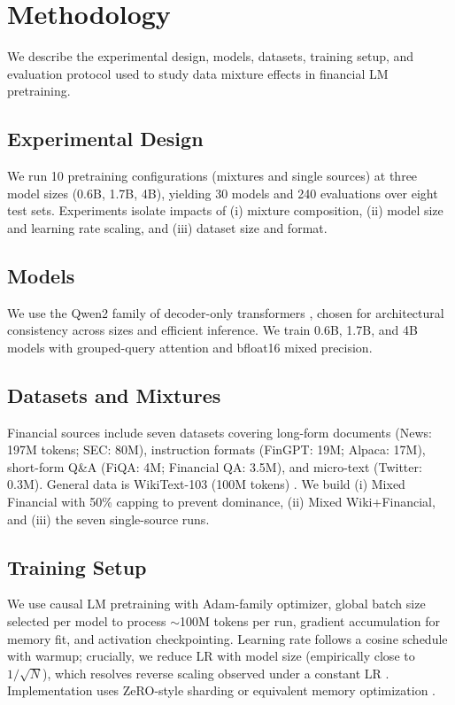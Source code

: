 \chapter{Methodology}

We describe the experimental design, models, datasets, training setup, and evaluation protocol used to study data mixture effects in financial LM pretraining.

\section{Experimental Design}
We run 10 pretraining configurations (mixtures and single sources) at three model sizes (0.6B, 1.7B, 4B), yielding 30 models and 240 evaluations over eight test sets. Experiments isolate impacts of (i) mixture composition, (ii) model size and learning rate scaling, and (iii) dataset size and format.

\section{Models}
We use the Qwen2 family of decoder-only transformers \parencite{yang2024qwen2}, chosen for architectural consistency across sizes and efficient inference. We train 0.6B, 1.7B, and 4B models with grouped-query attention and bfloat16 mixed precision.

\section{Datasets and Mixtures}
Financial sources include seven datasets covering long-form documents (News: 197M tokens; SEC: 80M), instruction formats (FinGPT: 19M; Alpaca: 17M), short-form Q\&A (FiQA: 4M; Financial QA: 3.5M), and micro-text (Twitter: 0.3M). General data is WikiText-103 (100M tokens) \parencite{merity2016pointer}. We build (i) Mixed Financial with 50\% capping to prevent dominance, (ii) Mixed Wiki+Financial, and (iii) the seven single-source runs.

\section{Training Setup}
We use causal LM pretraining with Adam-family optimizer, global batch size selected per model to process $\sim$100M tokens per run, gradient accumulation for memory fit, and activation checkpointing. Learning rate follows a cosine schedule with warmup; crucially, we reduce LR with model size (empirically close to $1/\sqrt{N}$), which resolves reverse scaling observed under a constant LR \parencite{mccandlish2018empirical}. Implementation uses ZeRO-style sharding or equivalent memory optimization \parencite{rajbhandari2020zero}.

